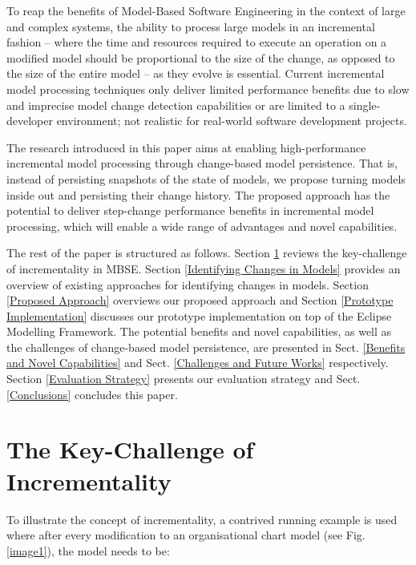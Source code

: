 \documentclass{llncs}
\begin{document}

To reap the benefits of Model-Based Software Engineering in the context of large and complex systems, the ability to process large models in an incremental fashion -- where the time and resources required to execute an operation on a modified model should be proportional to the size of the change, as opposed to the size of the entire model -- as they evolve is essential. Current incremental model processing techniques only deliver limited performance benefits due to slow and imprecise model change detection capabilities or are limited to a single-developer environment; not realistic for real-world software development projects. 

The research introduced in this paper aims at enabling high-performance incremental model processing through change-based model persistence. That is, instead of persisting snapshots of the state of models, we propose turning models inside out and persisting their change history. The proposed approach has the potential to deliver step-change performance benefits in incremental model processing, which will enable a wide range of advantages and novel capabilities.

The rest of the paper is structured as follows. Section \ref{The Key-Challenge of Incrementality} reviews the key-challenge of incrementality in MBSE. Section \ref{Identifying Changes in Models} provides an overview of existing approaches for identifying changes in models. Section \ref{Proposed Approach} overviews our proposed approach and Section \ref{Prototype Implementation} discusses our prototype implementation on top of the Eclipse Modelling Framework. The potential benefits and novel capabilities, as well as the challenges of change-based model persistence, are presented in Sect. \ref{Benefits and Novel Capabilities} and Sect. \ref{Challenges and Future Works} respectively. Section \ref{Evaluation Strategy} presents our evaluation strategy and Sect. \ref{Conclusions} concludes this paper.

\section{The Key-Challenge of Incrementality}
\label{The Key-Challenge of Incrementality}
To illustrate the concept of incrementality, a contrived running example is used where after every modification to an organisational chart model (see Fig. \ref{image1}), the model needs to be:
\end{document}
